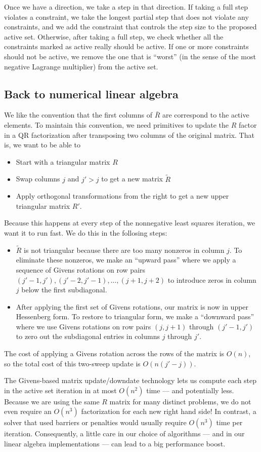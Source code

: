\documentclass[12pt, leqno]{article} %
\begin{document}
Once we have a direction, we take a step in that direction.  If taking
a full step violates a constraint, we take the longest partial step
that does not violate any constraints, and we add the constraint that
controls the step size to the proposed active set.  Otherwise, after
taking a full step, we check whether all the constraints marked as
active really should be active.  If one or more constraints should not
be active, we remove the one that is ``worst'' (in the sense of
the most negative Lagrange multiplier) from the active set.

\subsection*{Back to numerical linear algebra}

We like the convention that the first columns of $\bar{R}$ are
correspond to the active elements.  To maintain this convention,
we need primitives to update the $R$ factor in a QR factorization
after transposing two columns of the original matrix.  That is,
we want to be able to
\begin{itemize}
\item Start with a triangular matrix $R$
\item Swap columns $j$ and $j' > j$ to get a new matrix $\tilde{R}$
\item Apply orthogonal transformations from the right to get
  a new upper triangular matrix $R'$.
\end{itemize}
Because this happens at every step of the nonnegative least squares
iteration, we want it to run fast.  We do this in the follosing steps:
\begin{itemize}
\item
  $\tilde{R}$ is not triangular because there are too many nonzeros in
  column $j$.  To eliminate these nonzeros, we make an ``upward pass''
  where we apply a sequence of Givens rotations on row pairs
  $(j'-1,j'), (j'-2,j'-1), \ldots, (j+1,j+2)$ to introduce zeros in
  column $j$ below the first subdiagonal.
\item
  After applying the first set of Givens rotations, our matrix is now
  in upper Hessenberg form.  To restore to triangular form, we make
  a ``downward pass'' where we use Givens rotations on row pairs $(j,j+1)$
  through $(j'-1,j')$ to zero out the subdiagonal entries in columns $j$
  through $j'$.
\end{itemize}
The cost of applying a Givens rotation across the rows of the matrix
is $O(n)$, so the total cost of this two-sweep update is $O(n(j'-j))$.

The Givens-based matrix update/downdate technology lets us compute
each step in the active set iteration in at most $O(n^2)$ time --- and
potentially less.  Because we are using the same $R$ matrix for many
distinct problems, we do not even require an $O(n^3)$ factorization
for each new right hand side!  In contrast, a solver that used
barriers or penalties would usually require $O(n^3)$ time per
iteration.  Consequently, a little care in our choice of algorithms
--- and in our linear algebra implementations --- can lead to a big
performance boost.
\end{document}
